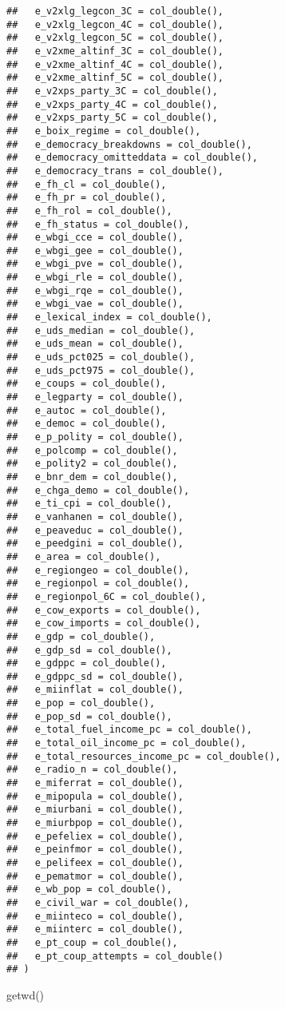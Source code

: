 \documentclass[
]{article}
\begin{document}
\begin{verbatim}
##   e_v2xlg_legcon_3C = col_double(),
##   e_v2xlg_legcon_4C = col_double(),
##   e_v2xlg_legcon_5C = col_double(),
##   e_v2xme_altinf_3C = col_double(),
##   e_v2xme_altinf_4C = col_double(),
##   e_v2xme_altinf_5C = col_double(),
##   e_v2xps_party_3C = col_double(),
##   e_v2xps_party_4C = col_double(),
##   e_v2xps_party_5C = col_double(),
##   e_boix_regime = col_double(),
##   e_democracy_breakdowns = col_double(),
##   e_democracy_omitteddata = col_double(),
##   e_democracy_trans = col_double(),
##   e_fh_cl = col_double(),
##   e_fh_pr = col_double(),
##   e_fh_rol = col_double(),
##   e_fh_status = col_double(),
##   e_wbgi_cce = col_double(),
##   e_wbgi_gee = col_double(),
##   e_wbgi_pve = col_double(),
##   e_wbgi_rle = col_double(),
##   e_wbgi_rqe = col_double(),
##   e_wbgi_vae = col_double(),
##   e_lexical_index = col_double(),
##   e_uds_median = col_double(),
##   e_uds_mean = col_double(),
##   e_uds_pct025 = col_double(),
##   e_uds_pct975 = col_double(),
##   e_coups = col_double(),
##   e_legparty = col_double(),
##   e_autoc = col_double(),
##   e_democ = col_double(),
##   e_p_polity = col_double(),
##   e_polcomp = col_double(),
##   e_polity2 = col_double(),
##   e_bnr_dem = col_double(),
##   e_chga_demo = col_double(),
##   e_ti_cpi = col_double(),
##   e_vanhanen = col_double(),
##   e_peaveduc = col_double(),
##   e_peedgini = col_double(),
##   e_area = col_double(),
##   e_regiongeo = col_double(),
##   e_regionpol = col_double(),
##   e_regionpol_6C = col_double(),
##   e_cow_exports = col_double(),
##   e_cow_imports = col_double(),
##   e_gdp = col_double(),
##   e_gdp_sd = col_double(),
##   e_gdppc = col_double(),
##   e_gdppc_sd = col_double(),
##   e_miinflat = col_double(),
##   e_pop = col_double(),
##   e_pop_sd = col_double(),
##   e_total_fuel_income_pc = col_double(),
##   e_total_oil_income_pc = col_double(),
##   e_total_resources_income_pc = col_double(),
##   e_radio_n = col_double(),
##   e_miferrat = col_double(),
##   e_mipopula = col_double(),
##   e_miurbani = col_double(),
##   e_miurbpop = col_double(),
##   e_pefeliex = col_double(),
##   e_peinfmor = col_double(),
##   e_pelifeex = col_double(),
##   e_pematmor = col_double(),
##   e_wb_pop = col_double(),
##   e_civil_war = col_double(),
##   e_miinteco = col_double(),
##   e_miinterc = col_double(),
##   e_pt_coup = col_double(),
##   e_pt_coup_attempts = col_double()
## )
\end{verbatim}

getwd()\\
\strut \\
\strut \\
\end{document}

